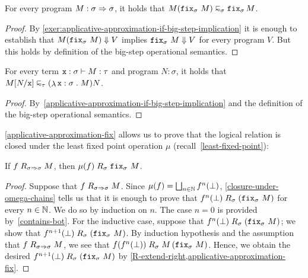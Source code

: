 \begin{corollary}\label{applicative-approximation-fix}
  For every program \(M : \sigma \pcffun \sigma\), it holds
  that \(M\pa*{\pcffix_\sigma \, M} \appapprox_\sigma \pcffix_\sigma M\).
\end{corollary}
\begin{proof}
  By \cref{exer:applicative-approximation-if-big-step-implication} it is enough
  to establish that \(M\pa*{\pcffix_\sigma\,M} \bigstep V\) implies
  \(\pcffix_\sigma \, M \bigstep V\) for every program \(V\).
  But this holds by definition of the big-step operational semantics.
\end{proof}

\begin{corollary}\label{applicative-approximation-beta}
  For every term \(\var x : \sigma \vdash M : \tau\) and program \(N : \sigma\),
  it holds that \(M[N/\var x] \appapprox_\tau \pa*{\lambdadot{\var x : \sigma}{M}}N\).
\end{corollary}
\begin{proof}
  By~\cref{applicative-approximation-if-big-step-implication} and the definition
  of the big-step operational semantics.
\end{proof}

\cref{applicative-approximation-fix} allows us to prove that the logical
relation is closed under the least fixed point operation \(\mu\)
(recall~\cref{least-fixed-point}):

\begin{lemma}\label{closure-under-mu}
  If \(f \logrel_{\sigma \pcffun \sigma} M\), then \(\mu(f) \logrel_\sigma {\pcffix_\sigma\,M}\).
\end{lemma}
\begin{proof}
  Suppose that \(f \logrel_{\sigma \pcffun \sigma} M\). Since
  \(\mu(f) = \bigsqcup_{n \in \Nat}f^n(\bot)\),
  \cref{closure-under-omega-chains} tells us that it is enough to prove that
  \(f^n(\bot) \logrel_\sigma \pa*{\pcffix_\sigma\,M}\) for every \(n \in \Nat\).
  We do so by induction on \(n\). The case \(n = 0\) is provided
  by~\cref{contains-bot}. For the inductive case, suppose that
  \(f^n(\bot) \logrel_\sigma \pa*{\pcffix_\sigma\,M}\); we show that
  \(f^{n+1}(\bot) \logrel_\sigma \pa*{\pcffix_\sigma\,M}\).
  By induction hypothesis and the assumption that
  \(f \logrel_{\sigma \pcffun \sigma} M\), we see that
  \(f\pa*{f^n(\bot)} \logrel_\sigma M\,\pa*{\pcffix_\sigma \, M}\).
  Hence, we obtain the desired
  \(f^{n+1}(\bot) \logrel_\sigma \pa*{\pcffix_\sigma\,M}\)
  by \cref{R-extend-right,applicative-approximation-fix}.
\end{proof}

